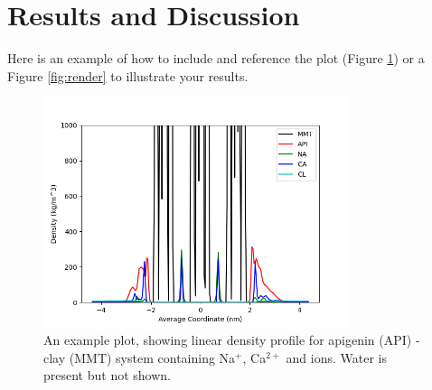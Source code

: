 \documentclass[a4paper,12pt]{scrarticle}
\begin{document}

\section*{Results and Discussion}
\textbf{\color{blue}{Approximately 500 words including tables and captions.\\
Describe your result data with a plot that illustrates your findings and a rendering  of the system.}}

Here is an example of how to include and reference the plot (Figure \ref{fig:plot}) or a Figure \ref{fig:render} to illustrate your results. 

\begin{figure}[h!]
    \begin{minipage}{\linewidth}
      \centering
      \includegraphics[width=0.8\textwidth]{my_plot.png}
      \caption{An example plot, showing linear density profile for apigenin (API) - clay (MMT) system containing Na$^{+}$, Ca$^{2+}$ and  ions. Water is present but not shown.}
      \label{fig:plot}
    \end{minipage}
\end{figure}
\end{document}
